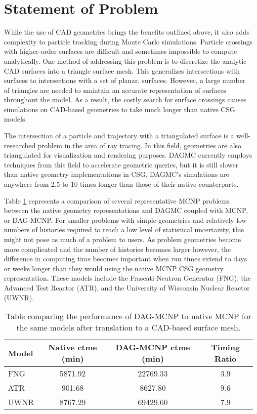 \section{Statement of Problem}\label{sec:problem-statement}

While the use of CAD geometries brings the benefits outlined above, it also adds
complexity to particle tracking during Monte Carlo simulations. Particle
crossings with higher-order surfaces are difficult and sometimes impossible to
compute analytically. One method of addressing this problem is to discretize the
analytic CAD surfaces into a triangle surface mesh. This generalizes
intersections with surfaces to intersections with a set of planar.
surfaces. However, a large number of triangles are needed to maintain an
accurate representation of surfaces throughout the model. As a result, the
costly search for surface crossings causes simulations on CAD-based geometries
to take much longer than native CSG models.

The intersection of a particle and trajectory with a triangulated surface is a
well-researched problem in the area of ray tracing. In this field, geometries
are also triangulated for visualization and rendering purposes. DAGMC currently
employs techniques from this field to accelerate geometric queries, but it is
still slower than native geometry implementations in CSG. DAGMC's simulations
are anywhere from 2.5 to 10 times longer than those of their native
counterparts.

Table \ref{dag-mcnp-benchmarks} represents a comparison of several
representative MCNP problems between the native geometry representations and
DAGMC coupled with MCNP, or DAG-MCNP. For smaller problems with simple
geometries and relatively low numbers of histories required to reach a low level
of statistical uncertainty, this might not pose as much of a problem to
users. As problem geometries become more complicated and the number of histories
becomes larger however, the difference in computing time becomes important when
run times extend to days or weeks longer than they would using the native MCNP
CSG geometry representation. These models include the Frascati Neutron Generator
(FNG), the Advanced Test Reactor (ATR), and the University of Wisconsin Nuclear
Reactor (UWNR).

\begin{table}[H]
  \centering
  \begin{tabular}{l c c c}
    \toprule
    Model & Native ctme (min) & DAG-MCNP ctme (min) & Timing Ratio \\
    \hline
    FNG   & 5871.92           & 22769.33            & 3.9   \\
    ATR   & 901.68            & 8627.80             & 9.6   \\
    UWNR  & 8767.29           & 69429.60            & 7.9   \\
    \hline
  \end{tabular}
  \caption{Table comparing the performance of DAG-MCNP to native MCNP for the
    same models after translation to a CAD-based surface mesh.}
  \label{dag-mcnp-benchmarks}  
\end{table}

